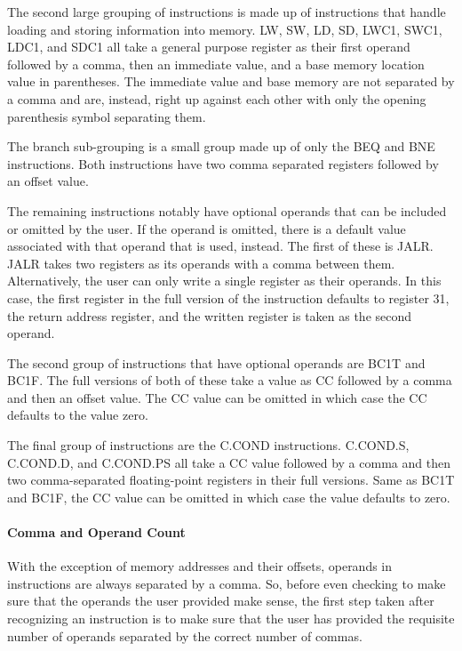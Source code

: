 \documentclass[parskip=half, fontsize=12pt]{scrartcl}
\begin{document}
The second large grouping of instructions is made up of instructions
that handle loading and storing information into memory. LW, SW, LD, SD,
LWC1, SWC1, LDC1, and SDC1 all take a general purpose register as their
first operand followed by a comma, then an immediate value, and a base
memory location value in parentheses. The immediate value and base
memory are not separated by a comma and are, instead, right up against
each other with only the opening parenthesis symbol separating them.

The branch sub-grouping is a small group made up of only the BEQ and BNE
instructions. Both instructions have two comma separated registers
followed by an offset value.

The remaining instructions notably have optional operands that can be
included or omitted by the user. If the operand is omitted, there is a
default value associated with that operand that is used, instead. The
first of these is JALR. JALR takes two registers as its operands with a
comma between them. Alternatively, the user can only write a single
register as their operands. In this case, the first register in the full
version of the instruction defaults to register 31, the return address
register, and the written register is taken as the second operand.

The second group of instructions that have optional operands are BC1T
and BC1F. The full versions of both of these take a value as CC followed
by a comma and then an offset value. The CC value can be omitted in
which case the CC defaults to the value zero.

The final group of instructions are the C.COND instructions. C.COND.S,
C.COND.D, and C.COND.PS all take a CC value followed by a comma and then
two comma-separated floating-point registers in their full versions.
Same as BC1T and BC1F, the CC value can be omitted in which case the
value defaults to zero.

\paragraph{Comma and Operand Count}

With the exception of memory addresses and their offsets, operands in
instructions are always separated by a comma. So, before even checking
to make sure that the operands the user provided make sense, the first
step taken after recognizing an instruction is to make sure that the
user has provided the requisite number of operands separated by the
correct number of commas.
\end{document}
